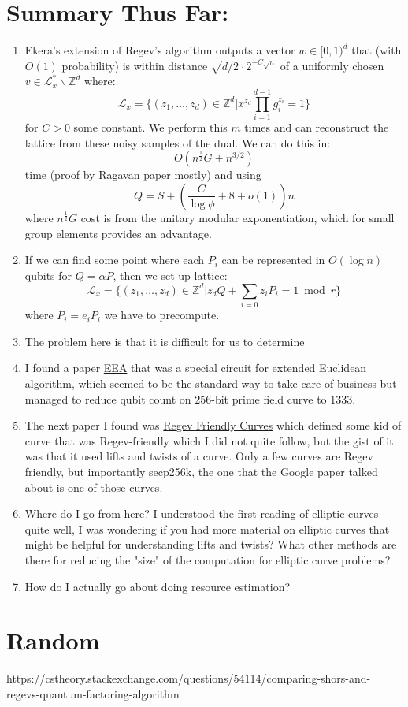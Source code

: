 \documentclass{article}
\begin{document}
\section{Summary Thus Far:}
\begin{enumerate}
	\item Ekera's extension of Regev's algorithm outputs a vector $w\in [0,1)^d$ that (with $O(1)$ probability) is within distance $\sqrt{d/2} \cdot 2^{-C\sqrt{n}}$ of a uniformly chosen $v \in \mathcal{L}_x^* \backslash \mathbb{Z}^d$ where:
		$$\mathcal{L}_x = \{ (z_1, \dots, z_d) \in \mathbb{Z}^d | x^{z_d} \prod_{i=1}^{d-1} g_i^{z_i} = 1\}$$ for $C>0$ some constant. We perform this $m$ times and can reconstruct the lattice from these noisy samples of the dual. We can do this in:
		$$O(n^\frac12 G + n^{3/2})$$
		time (proof by Ragavan paper mostly) and using
	$$Q = S + (\frac{C}{\log \phi} + 8 + o(1))n$$
	where $n^\frac12 G$ cost is from the unitary modular exponentiation, which for small group elements provides an advantage. 
\item If we can find some point where each $P_i$ can be represented in $O(\log n)$ qubits for $Q = \alpha P$, then we set up lattice:
	$$\mathcal{L}_x = \{ (z_1, \dots, z_d) \in \mathbb{Z}^d | z_d Q + \sum_{i=0} z_i P_i = 1 \bmod r\}$$
	where $P_i = e_i P_i$ we have to precompute.
\item The problem here is that it is difficult for us to determine 
\item I found a paper \href{https://arxiv.org/pdf/2604.02311}{EEA} that was a special circuit for extended Euclidean algorithm, which seemed to be the standard way to take care of business but managed to reduce qubit count on 256-bit prime field curve to 1333.
\item The next paper I found was \href{https://hal.science/hal-04833072/file/Regev_for_elliptic_curves.pdf}{Regev Friendly Curves} which defined some kid of curve that was Regev-friendly which I did not quite follow, but the gist of it was that it used lifts and twists of a curve. Only a few curves are Regev friendly, but importantly secp256k, the one that the Google paper talked about is one of those curves.
\item Where do I go from here? I understood the first reading of elliptic curves quite well, I was wondering if you had more material on elliptic curves that might be helpful for understanding lifts and twists? What other methods are there for reducing the "size" of the computation for elliptic curve problems?
	\item How do I actually go about doing resource estimation?
\end{enumerate}
\section{Random}
https://cstheory.stackexchange.com/questions/54114/comparing-shors-and-regevs-quantum-factoring-algorithm
\end{document}

